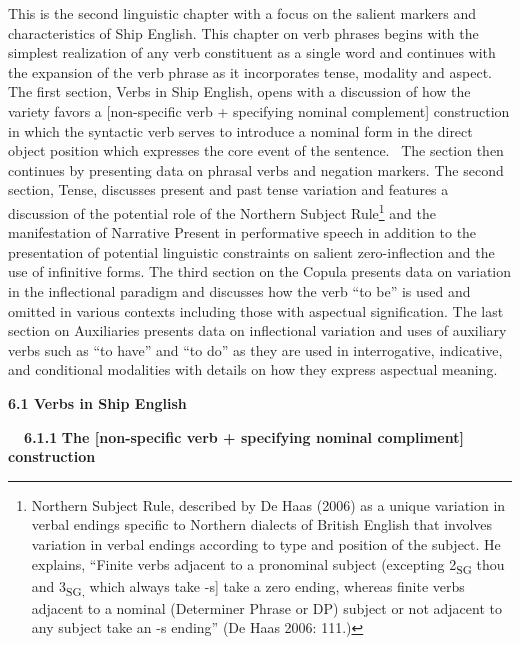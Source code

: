\begin{styleStandard}
This is the second linguistic chapter with a focus on the salient markers and characteristics of Ship English. This chapter on verb phrases begins with the simplest realization of any verb constituent as a single word and continues with the expansion of the verb phrase as it incorporates tense, modality and aspect. The first section, Verbs in Ship English, opens with a discussion of how the variety favors a [non-specific verb + specifying nominal complement] construction in which the syntactic verb serves to introduce a nominal form in the direct object position which expresses the core event of the sentence. \ The section then continues by presenting data on phrasal verbs and negation markers. The second section, Tense, discusses present and past tense variation and features a discussion of the potential role of the Northern Subject Rule\footnote{ Northern Subject Rule, described by De Haas (2006) as a unique variation in verbal endings specific to Northern dialects of British English that involves variation in verbal endings according to type and position of the subject. He explains, “Finite verbs adjacent to a pronominal subject (excepting 2\textsubscript{SG }thou and 3\textsubscript{SG, }which always take -s] take a zero ending, whereas finite verbs adjacent to a nominal (Determiner Phrase or DP) subject or not adjacent to any subject take an -s ending” (De Haas 2006: 111.)} and the manifestation of Narrative Present in performative speech in addition to the presentation of potential linguistic constraints on salient zero-inflection and the use of infinitive forms. The third section on the Copula presents data on variation in the inflectional paradigm and discusses how the verb “to be” is used and omitted in various contexts including those with aspectual signification. The last section on Auxiliaries presents data on inflectional variation and uses of auxiliary verbs such as “to have” and “to do” as they are used in interrogative, indicative, and conditional modalities with details on how they express aspectual meaning. 
\end{styleStandard}


\begin{styleStandard}
\textbf{6.1 Verbs in Ship English}
\end{styleStandard}


\begin{styleStandard}
\textbf{\ \ 6.1.1} \textbf{The [non-specific verb + specifying nominal compliment] construction}
\end{styleStandard}


